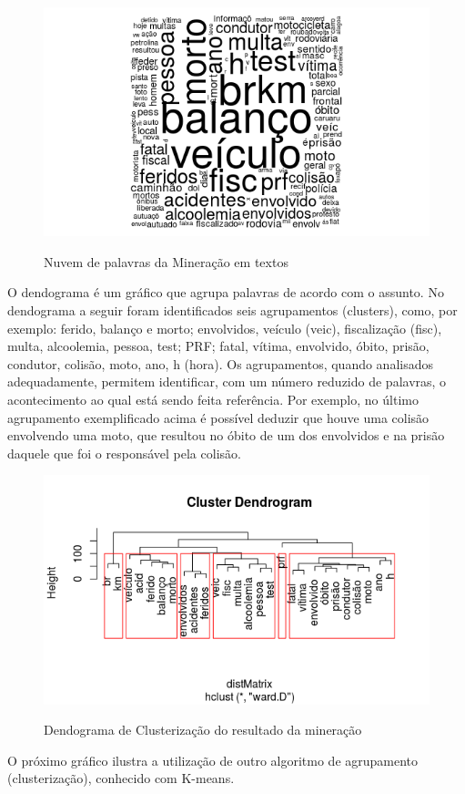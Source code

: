 \begin{figure}
\centering
\caption{Nuvem de palavras da Mineração em textos}
\includegraphics[width=0.7\linewidth]{Figuras/Twitter//Nuvem2}
\label{fig:Nuvem1}
\end{figure}


\pagebreak

O dendograma é um gráfico que agrupa palavras de acordo com o assunto. No dendograma a seguir foram identificados seis agrupamentos (clusters), como, por exemplo: ferido, balanço e morto; envolvidos, veículo (veic), fiscalização (fisc), multa, alcoolemia, pessoa, test; PRF; fatal, vítima, envolvido, óbito, prisão, condutor, colisão, moto, ano, h (hora). Os agrupamentos, quando analisados adequadamente, permitem identificar, com um número reduzido de palavras, o acontecimento ao qual está sendo feita referência. Por exemplo, no último agrupamento exemplificado acima é possível deduzir que houve uma colisão envolvendo uma moto, que resultou no óbito de um dos envolvidos e na prisão daquele que foi o responsável pela colisão.   

\begin{figure}
\centering
\caption{Dendograma de Clusterização do resultado da mineração}
\includegraphics[width=0.7\linewidth]{Figuras/Twitter//Cluster}
\label{fig:Cluster}
\end{figure}

O próximo gráfico ilustra a utilização de outro algoritmo de agrupamento (clusterização), conhecido com K-means. 

